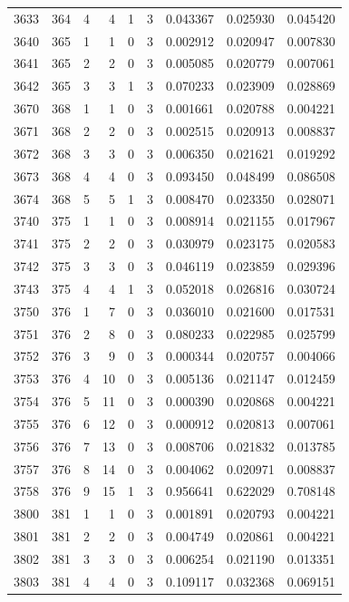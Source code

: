 \begin{longtable}{rrrrrrrrr}
3633 & 364 & 4 & 4 & 1 & 3 & 0.043367 & 0.025930 & 0.045420 \\
3640 & 365 & 1 & 1 & 0 & 3 & 0.002912 & 0.020947 & 0.007830 \\
3641 & 365 & 2 & 2 & 0 & 3 & 0.005085 & 0.020779 & 0.007061 \\
3642 & 365 & 3 & 3 & 1 & 3 & 0.070233 & 0.023909 & 0.028869 \\
3670 & 368 & 1 & 1 & 0 & 3 & 0.001661 & 0.020788 & 0.004221 \\
3671 & 368 & 2 & 2 & 0 & 3 & 0.002515 & 0.020913 & 0.008837 \\
3672 & 368 & 3 & 3 & 0 & 3 & 0.006350 & 0.021621 & 0.019292 \\
3673 & 368 & 4 & 4 & 0 & 3 & 0.093450 & 0.048499 & 0.086508 \\
3674 & 368 & 5 & 5 & 1 & 3 & 0.008470 & 0.023350 & 0.028071 \\
3740 & 375 & 1 & 1 & 0 & 3 & 0.008914 & 0.021155 & 0.017967 \\
3741 & 375 & 2 & 2 & 0 & 3 & 0.030979 & 0.023175 & 0.020583 \\
3742 & 375 & 3 & 3 & 0 & 3 & 0.046119 & 0.023859 & 0.029396 \\
3743 & 375 & 4 & 4 & 1 & 3 & 0.052018 & 0.026816 & 0.030724 \\
3750 & 376 & 1 & 7 & 0 & 3 & 0.036010 & 0.021600 & 0.017531 \\
3751 & 376 & 2 & 8 & 0 & 3 & 0.080233 & 0.022985 & 0.025799 \\
3752 & 376 & 3 & 9 & 0 & 3 & 0.000344 & 0.020757 & 0.004066 \\
3753 & 376 & 4 & 10 & 0 & 3 & 0.005136 & 0.021147 & 0.012459 \\
3754 & 376 & 5 & 11 & 0 & 3 & 0.000390 & 0.020868 & 0.004221 \\
3755 & 376 & 6 & 12 & 0 & 3 & 0.000912 & 0.020813 & 0.007061 \\
3756 & 376 & 7 & 13 & 0 & 3 & 0.008706 & 0.021832 & 0.013785 \\
3757 & 376 & 8 & 14 & 0 & 3 & 0.004062 & 0.020971 & 0.008837 \\
3758 & 376 & 9 & 15 & 1 & 3 & 0.956641 & 0.622029 & 0.708148 \\
3800 & 381 & 1 & 1 & 0 & 3 & 0.001891 & 0.020793 & 0.004221 \\
3801 & 381 & 2 & 2 & 0 & 3 & 0.004749 & 0.020861 & 0.004221 \\
3802 & 381 & 3 & 3 & 0 & 3 & 0.006254 & 0.021190 & 0.013351 \\
3803 & 381 & 4 & 4 & 0 & 3 & 0.109117 & 0.032368 & 0.069151 \\

\end{longtable}
